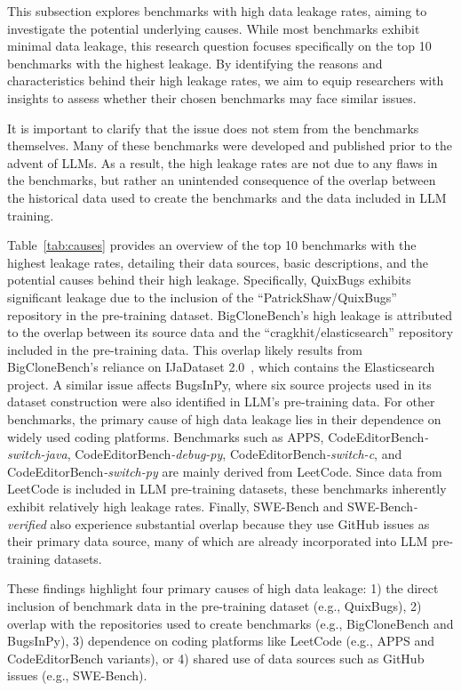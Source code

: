 This subsection explores benchmarks with high data leakage rates, aiming to investigate the potential underlying causes. While most benchmarks exhibit minimal data leakage, this research question focuses specifically on the top 10 benchmarks with the highest leakage. By identifying the reasons and characteristics behind their high leakage rates, we aim to equip researchers with insights to assess whether their chosen benchmarks may face similar issues.

It is important to clarify that the issue does not stem from the benchmarks themselves. Many of these benchmarks were developed and published prior to the advent of LLMs. As a result, the high leakage rates are not due to any flaws in the benchmarks, but rather an unintended consequence of the overlap between the historical data used to create the benchmarks and the data included in LLM training.

Table~\ref{tab:causes} provides an overview of the top 10 benchmarks with the highest leakage rates, detailing their data sources, basic descriptions, and the potential causes behind their high leakage. Specifically, QuixBugs exhibits significant leakage due to the inclusion of the ``PatrickShaw/QuixBugs'' repository in the pre-training dataset. BigCloneBench's high leakage is attributed to the overlap between its source data and the ``cragkhit/elasticsearch'' repository included in the pre-training data. This overlap likely results from BigCloneBench’s reliance on IJaDataset 2.0~\cite{IJaDataset}, which contains the Elasticsearch project. A similar issue affects BugsInPy, where six source projects used in its dataset construction were also identified in LLM's pre-training data.
For other benchmarks, the primary cause of high data leakage lies in their dependence on widely used coding platforms. Benchmarks such as APPS, CodeEditorBench\textit{-switch-java}, CodeEditorBench\textit{-debug-py}, CodeEditorBench\textit{-switch-c}, and CodeEditorBench\textit{-switch-py} are mainly derived from LeetCode. Since data from LeetCode is included in LLM pre-training datasets, these benchmarks inherently exhibit relatively high leakage rates. Finally, SWE-Bench and SWE-Bench\textit{-verified} also experience substantial overlap because they use GitHub issues as their primary data source, many of which are already incorporated into LLM pre-training datasets.


These findings highlight four primary causes of high data leakage: 1) the direct inclusion of benchmark data in the pre-training dataset (e.g., QuixBugs), 2) overlap with the repositories used to create benchmarks (e.g., BigCloneBench and BugsInPy), 3) dependence on coding platforms like LeetCode (e.g., APPS and CodeEditorBench variants), or 4) shared use of data sources such as GitHub issues (e.g., SWE-Bench).



